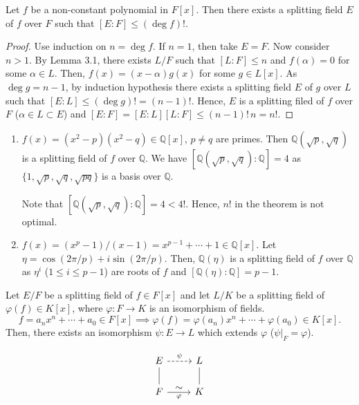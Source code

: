\documentclass[twoside]{article}
\newcommand\Q{\mathbb Q}
\theoremstyle{remark}
\newcounter{theorem}
\begin{document}
\begin{theorem}
  Let \(f\) be a non-constant polynomial in \(F[x]\). Then there exists a splitting field \(E\) of \(f\) over \(F\) such that \([E:F] \leq (\deg f)!\).
\end{theorem}

\begin{proof}
  Use induction on \(n = \deg f\). If \(n=1\), then take \(E=F\). Now consider \(n>1\). By Lemma 3.1, there exists \(L/F\) such that \([L:F] \leq n\) and \(f(\alpha) = 0\) for some \(\alpha \in L\). Then, \(f(x) = (x-\alpha)g(x)\) for some \(g \in L[x]\). As \(\deg g = n-1\), by induction hypothesis there exists a splitting field \(E\) of \(g\) over \(L\) such that \([E:L] \leq (\deg g)! = (n-1)!\). Hence, \(E\) is a splitting filed of \(f\) over \(F\) (\(\alpha \in L \subset E\)) and \([E:F] = [E:L] [L:F] \leq (n-1)! \, n = n!\).
\end{proof}

\begin{examples}
  \begin{enumerate}[label=\arabic*.]
    \item \(f(x) = (x^2-p) (x^2-q) \in \Q[x]\), \(p \neq q\) are primes. Then \(\Q(\sqrt p, \sqrt q)\) is a splitting field of \(f\) over \(\Q\). We have \([\Q(\sqrt p,\sqrt q):\Q] = 4\)  as \(\{1, \sqrt p, \sqrt q, \sqrt{pq}\}\) is a basis over \(\Q\). \par
    Note that \([\Q(\sqrt p, \sqrt q):\Q] = 4 < 4!\). Hence, \(n!\) in the theorem is not optimal.
    \item \(f(x) = (x^p-1)/(x-1) = x^{p-1} + \cdots + 1 \in \Q[x]\). Let \(\eta = \cos(2\pi/p) + i \sin(2\pi/p)\). Then, \(\Q(\eta)\) is a splitting field of \(f\) over \(\Q\) as \(\eta^i\) (\(1 \leq i \leq p-1\)) are roots of \(f\) and \([\Q(\eta):\Q] = p-1\).
  \end{enumerate}
\end{examples}

\begin{theorem}
  Let \(E/F\) be a splitting field of \(f \in F[x]\) and let \(L/K\) be a splitting field of \(\varphi(f) \in K[x]\), where \(\varphi\colon F \to K\) is an isomorphism of fields.
  \[ f = a_nx^n + \cdots + a_0 \in F[x] \implies \varphi(f) = \varphi(a_n)x^n + \cdots + \varphi(a_0) \in K[x]. \]
  Then, there exists an isomorphism \(\psi\colon E \to L\) which extends \(\varphi\) (\(\psi|_F = \varphi\)).
\end{theorem}

\begin{displaymath}
  \begin{tikzcd}
    E\rar[dashed,"\psi"]\dar[dash] & L\dar[dash] \\ F\rar["\textstyle\sim","\varphi"swap] & K
  \end{tikzcd}
\end{displaymath}
\end{document}
